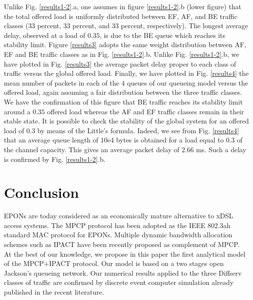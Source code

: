 \documentclass[a4paper,10pt]{IEEEtran}
\begin{document}
Unlike Fig. \ref{results1-2}.a, one assumes in figure
\ref{results1-2}.b (lower figure) that the total offered load is
uniformly distributed between EF, AF, and BE traffic classes (33
percent, 33 percent, and 33 percent, respectively). The longest
average delay, observed at a load of $0.35$, is due to the BE queue
which reaches its stability limit. Figure \ref{results3} adopts the
same weight distribution between AF, EF and BE traffic classes as in
Fig. \ref{results1-2}.b. Unlike Fig. \ref{results1-2}.b, we have
plotted in Fig. \ref{results3} the average packet delay proper to
each class of traffic versus the global offered load. Finally, we
have plotted in Fig. \ref{results4} the mean number of packets in
each of the $4$ queues of our queueing model versus the offered
load, again assuming a fair distribution between the three traffic
classes. We have the confirmation of this figure that BE traffic
reaches its stability limit around a $0.35$ offered load whereas the
AF and EF traffic classes remain in their stable state. It is
possible to check the stability of the global system for an offered
load of $0.3$ by means of the Little's formula. Indeed, we see from
Fig. \ref{results4} that an average queue length of $10$e$4$ bytes
is obtained for a load equal to $0.3$ of the channel capacity. This
gives an average packet delay of $2.66$ ms. Such a delay is
confirmed by Fig. \ref{results1-2}.b.

\section{Conclusion}
EPONs are today considered as an economically mature alternative to
xDSL access systems. The MPCP protocol has been adopted as the IEEE
802.3ah standard MAC protocol for EPONs. Multiple dynamic bandwidth
allocation schemes such as IPACT have been recently proposed as
complement of MPCP. At the best of our knowledge, we propose in this
paper the first analytical model of the MPCP+IPACT protocol. Our
model is based on a two stages open Jackson's queueing network. Our
numerical results applied to the three Diffserv classes of traffic
are confirmed by discrete event computer simulation already
published in the recent literature.


\end{document}
